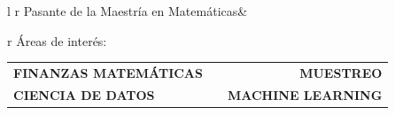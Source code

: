 \documentclass[]{friggeri-cv}
\begin{document}
      {
      		\hspace{5.3cm}\begin{tabular}{l r}
		Pasante de la Maestría en Matemáticas&\color{gray}
			\normalsize
			{
			\begin{tabular}{r}
				Áreas de interés:\\ 
				\hspace{0.4cm}\scriptsize\begin{tabular}{l r r}
					\textbf{FINANZAS MATEMÁTICAS}&\hspace{0.2cm} &\textbf{MUESTREO}\\
					\textbf{CIENCIA DE DATOS}& &\textbf{MACHINE LEARNING}\\
				\end{tabular}
			\end{tabular}
			}
		\end{tabular}
	}

\vspace{0.5cm}
\end{document}
